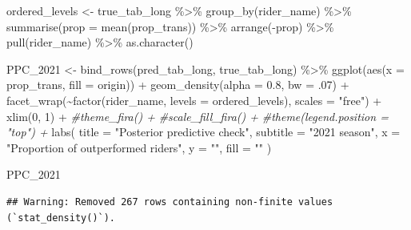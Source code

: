 \documentclass[
]{article}
\newenvironment{Shaded}{\begin{snugshade}}{\end{snugshade}}
\newcommand{\AttributeTok}[1]{\textcolor[rgb]{0.77,0.63,0.00}{#1}}
\newcommand{\CommentTok}[1]{\textcolor[rgb]{0.56,0.35,0.01}{\textit{#1}}}
\newcommand{\DecValTok}[1]{\textcolor[rgb]{0.00,0.00,0.81}{#1}}
\newcommand{\FloatTok}[1]{\textcolor[rgb]{0.00,0.00,0.81}{#1}}
\newcommand{\FunctionTok}[1]{\textcolor[rgb]{0.00,0.00,0.00}{#1}}
\newcommand{\NormalTok}[1]{#1}
\newcommand{\OtherTok}[1]{\textcolor[rgb]{0.56,0.35,0.01}{#1}}
\newcommand{\SpecialCharTok}[1]{\textcolor[rgb]{0.00,0.00,0.00}{#1}}
\newcommand{\StringTok}[1]{\textcolor[rgb]{0.31,0.60,0.02}{#1}}
\begin{document}
\begin{Shaded}
\begin{Highlighting}[]
\NormalTok{ordered\_levels }\OtherTok{\textless{}{-}}
\NormalTok{  true\_tab\_long }\SpecialCharTok{\%\textgreater{}\%}
  \FunctionTok{group\_by}\NormalTok{(rider\_name) }\SpecialCharTok{\%\textgreater{}\%}
  \FunctionTok{summarise}\NormalTok{(}\AttributeTok{prop =} \FunctionTok{mean}\NormalTok{(prop\_trans)) }\SpecialCharTok{\%\textgreater{}\%}
  \FunctionTok{arrange}\NormalTok{(}\SpecialCharTok{{-}}\NormalTok{prop) }\SpecialCharTok{\%\textgreater{}\%}
  \FunctionTok{pull}\NormalTok{(rider\_name) }\SpecialCharTok{\%\textgreater{}\%}
  \FunctionTok{as.character}\NormalTok{()}


\NormalTok{PPC\_2021 }\OtherTok{\textless{}{-}} \FunctionTok{bind\_rows}\NormalTok{(pred\_tab\_long, true\_tab\_long) }\SpecialCharTok{\%\textgreater{}\%}
            \FunctionTok{ggplot}\NormalTok{(}\FunctionTok{aes}\NormalTok{(}\AttributeTok{x =}\NormalTok{ prop\_trans, }\AttributeTok{fill =}\NormalTok{ origin)) }\SpecialCharTok{+}
            \FunctionTok{geom\_density}\NormalTok{(}\AttributeTok{alpha =} \FloatTok{0.8}\NormalTok{, }\AttributeTok{bw =}\NormalTok{ .}\DecValTok{07}\NormalTok{) }\SpecialCharTok{+}
            \FunctionTok{facet\_wrap}\NormalTok{(}\SpecialCharTok{\textasciitilde{}}\FunctionTok{factor}\NormalTok{(rider\_name, }\AttributeTok{levels =}\NormalTok{ ordered\_levels), }\AttributeTok{scales =} \StringTok{"free"}\NormalTok{) }\SpecialCharTok{+}
            \FunctionTok{xlim}\NormalTok{(}\DecValTok{0}\NormalTok{, }\DecValTok{1}\NormalTok{) }\SpecialCharTok{+}
            \CommentTok{\#theme\_fira() +}
            \CommentTok{\#scale\_fill\_fira() +}
            \CommentTok{\#theme(legend.position = "top") +}
            \FunctionTok{labs}\NormalTok{(}
              \AttributeTok{title =} \StringTok{"Posterior predictive check"}\NormalTok{,}
              \AttributeTok{subtitle =} \StringTok{"2021 season"}\NormalTok{,}
              \AttributeTok{x =} \StringTok{"Proportion of outperformed riders"}\NormalTok{,}
              \AttributeTok{y =} \StringTok{""}\NormalTok{,}
              \AttributeTok{fill =} \StringTok{""}
\NormalTok{            )}

\NormalTok{PPC\_2021}
\end{Highlighting}
\end{Shaded}

\begin{verbatim}
## Warning: Removed 267 rows containing non-finite values (`stat_density()`).
\end{verbatim}
\end{document}
